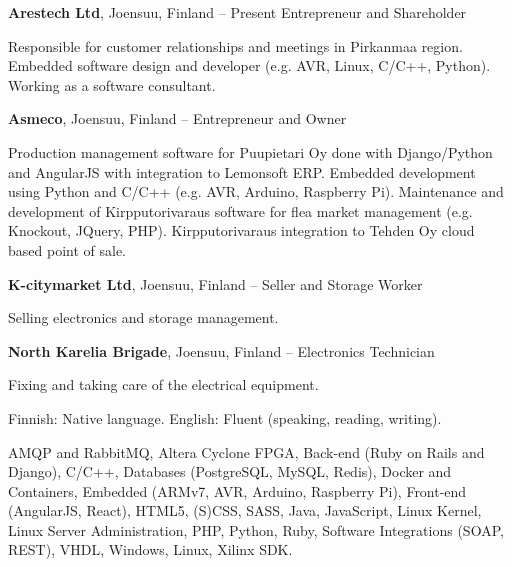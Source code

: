 \documentclass[letterpaper,MMMyyyy,nonstopmode]{simpleresumecv}
\begin{document}
\begin{Body}
\BigGap
\Entry
\textbf{Arestech Ltd}, Joensuu, Finland
\hfill
{} -- Present
\Gap
\BulletItem Entrepreneur and Shareholder
\begin{Detail}
    \SubBulletItem Responsible for customer relationships and meetings in
    Pirkanmaa region.
    \SubBulletItem Embedded software design and developer (e.g. AVR, Linux,
    C/C++, Python).
    \SubBulletItem Working as a software consultant.
\end{Detail}

\BigGap
\Entry
\textbf{Asmeco}, Joensuu, Finland
\hfill
{} -- 
\Gap
\BulletItem Entrepreneur and Owner
\begin{Detail}
    \SubBulletItem Production management software for Puupietari Oy done with
    Django/Python and \newline AngularJS with integration to Lemonsoft ERP.
    \SubBulletItem Embedded development using Python and C/C++ (e.g. AVR,
    Arduino, Raspberry Pi).
    \SubBulletItem Maintenance and development of Kirpputorivaraus software for
    flea market \newline management (e.g. Knockout, JQuery, PHP).
    \SubBulletItem Kirpputorivaraus integration to Tehden Oy cloud based point
    of sale.
\end{Detail}

\BigGap
\Entry
\textbf{K-citymarket Ltd}, Joensuu, Finland
\hfill
{} -- 
\Gap
\BulletItem Seller and Storage Worker
\begin{Detail}
    \SubBulletItem Selling electronics and storage management.
\end{Detail}

\BigGap
\Entry
\textbf{North Karelia Brigade}, Joensuu, Finland
\hfill
{} -- 
\Gap
\BulletItem Electronics Technician
\begin{Detail}
    \SubBulletItem Fixing and taking care of the electrical equipment.
\end{Detail}

\newpage



\BulletItem Finnish: Native language.
\Gap
\BulletItem English: Fluent (speaking, reading, writing).



\Entry
\BulletItem AMQP and RabbitMQ,
\BulletItem Altera Cyclone FPGA,
\BulletItem Back-end (Ruby on Rails and Django),
\BulletItem C/C++,
\BulletItem Databases (PostgreSQL, MySQL, Redis),
\BulletItem Docker and Containers,
\BulletItem Embedded (ARMv7, AVR, Arduino, Raspberry Pi),
\BulletItem Front-end (AngularJS, React),
\BulletItem HTML5, (S)CSS, SASS,
\BulletItem Java,
\BulletItem JavaScript,
\BulletItem Linux Kernel,
\BulletItem Linux Server Administration,
\BulletItem PHP,
\BulletItem Python,
\BulletItem Ruby,
\BulletItem Software Integrations (SOAP, REST),
\BulletItem VHDL,
\BulletItem Windows, Linux,
\BulletItem Xilinx SDK.


\end{Body}
\end{document}
